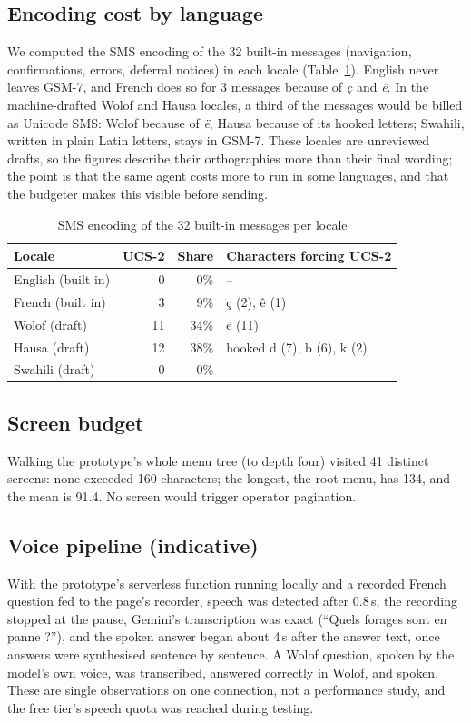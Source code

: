 \documentclass[conference]{IEEEtran}
\begin{document}
\subsection{Encoding cost by language}
We computed the SMS encoding of the 32 built-in messages (navigation,
confirmations, errors, deferral notices) in each locale
(Table~\ref{tab:encoding}). English never leaves GSM-7, and French does so for
3 messages because of \textit{\c{c}} and \textit{\^e}. In the machine-drafted
Wolof and Hausa locales, a third of the messages would be billed as Unicode
SMS: Wolof because of \textit{\"e}, Hausa because of its hooked letters;
Swahili, written in plain Latin letters, stays in GSM-7. These locales are
unreviewed drafts, so the figures describe their orthographies more than
their final wording; the point is that the same agent costs more to run in
some languages, and that the budgeter makes this visible before sending.

\begin{table}[t]
\centering
\caption{SMS encoding of the 32 built-in messages per locale}
\label{tab:encoding}
\begin{tabular}{@{}lrrl@{}}
\toprule
Locale & UCS-2 & Share & Characters forcing UCS-2 \\
\midrule
English (built in) & 0 & 0\% & -- \\
French (built in) & 3 & 9\% & \c{c} (2), \^e (1) \\
Wolof (draft) & 11 & 34\% & \"e (11) \\
Hausa (draft) & 12 & 38\% & hooked d (7), b (6), k (2) \\
Swahili (draft) & 0 & 0\% & -- \\
\bottomrule
\end{tabular}
\end{table}

\subsection{Screen budget}
Walking the prototype's whole menu tree (to depth four) visited 41 distinct
screens: none exceeded 160 characters; the longest, the root menu, has 134,
and the mean is 91.4. No screen would trigger operator pagination.

\subsection{Voice pipeline (indicative)}
With the prototype's serverless function running locally and a recorded
French question fed to the page's recorder, speech was detected after 0.8\,s, the recording stopped at
the pause, Gemini's transcription was exact (``Quels forages sont en panne
?''), and the spoken answer began about 4\,s after the answer text, once
answers were synthesised sentence by sentence. A Wolof question, spoken by
the model's own voice, was transcribed, answered correctly in Wolof, and
spoken. These are single observations on one connection, not a performance
study, and the free tier's speech quota was reached during testing.
\end{document}
